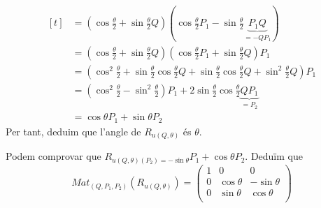 \documentclass[../main.tex]{subfiles}
\begin{document}
\begin{demostracio}
\begin{displaymath}
\begin{aligned}[t]
									&= (\cos{\frac{\theta}{2}} + \sin{\frac{\theta}{2}}Q)(\cos{\frac{\theta}{2}}P_1 - \sin{\frac{\theta}{2}}\underbrace{P_1Q}_{=-QP_1})\\
									&= (\cos{\frac{\theta}{2}} + \sin{\frac{\theta}{2}}Q)(\cos{\frac{\theta}{2}}P_1 + \sin{\frac{\theta}{2}}Q)P_1\\
									&= (\cos^2{\frac{\theta}{2}} + \sin{\frac{\theta}{2}}\cos{\frac{\theta}{2}}Q + \sin{\frac{\theta}{2}}\cos{\frac{\theta}{2}}Q + \sin^2{\frac{\theta}{2}}Q)P_1\\
									&= (\cos^2{\frac{\theta}{2}} - \sin^2{\frac{\theta}{2}})P_1 + 2\sin{\frac{\theta}{2}}\cos{\frac{\theta}{2}}\underbrace{QP_1}_{=P_2}\\
									&= \cos{\theta}P_1 + \sin{\theta}P_2
			\end{aligned}
		\end{displaymath}
		Per tant, deduim que l'angle de $R_{u(Q, \theta)}$ és $\theta$.
	\end{demostracio}
	\begin{obs}
		Podem comprovar que $R_{u(Q, \theta)(P_2) = -\sin{\theta}}P_1 + \cos{\theta}P_2$.
		Deduïm que
		\begin{displaymath}
			Mat_(Q, P_1, P_2)(R_{u(Q, \theta)}) = \begin{pmatrix}
				1 & 0 & 0\\
				0 & \cos{\theta} & -\sin{\theta}\\
				0 &\sin{\theta} & \cos{\theta}\\
			\end{pmatrix}
		\end{displaymath}
	\end{obs}
\end{document}
